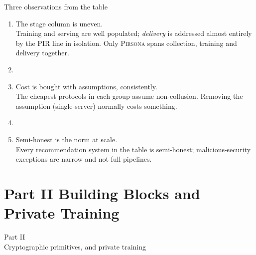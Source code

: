 \documentclass[10pt,aspectratio=169]{beamer}
\newcommand{\sys}[1]{\textsc{#1}\xspace}
\begin{document}
\begin{frame}{Three observations from the table}
  \begin{enumerate}
    \item \alert{The stage column is uneven.}\\
      Training and serving are well populated; \emph{delivery} is addressed almost
      entirely by the PIR line in isolation. Only \sys{Pirsona} spans
      collection, training and delivery together.
    \item[]
    \item \alert{Cost is bought with assumptions, consistently.}\\
      The cheapest protocols in each group assume non-collusion. Removing the
      assumption (single-server) normally costs something.
    \item[]
    \item \alert{Semi-honest is the norm at scale.}\\
      Every recommendation system in the table is semi-honest; malicious-security
      exceptions are narrow and not full pipelines.
  \end{enumerate}
\end{frame}
 
\section{Part II \textbar{} Building Blocks and Private Training}
 
\begin{frame}[standout]
  Part II\\[0.4em]
  {\normalsize Cryptographic primitives, and private training}
\end{frame}
 
\end{document}

